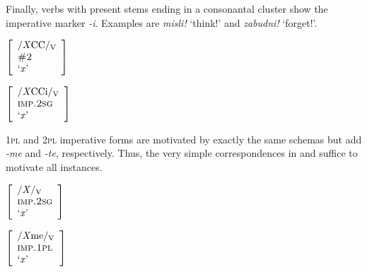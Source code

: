\documentclass[output=paper,colorlinks,citecolor=brown,
]{langscibook}
\begin{document}
\bigskip

\noindent Finally, verbs with present stems ending in a consonantal cluster show the imperative marker \textit{-i}. Examples are \textit{misli!} `think!' and \textit{zabudni!} `forget!'.

\begin{minipage}[t]{0.28\textwidth}
\ea\label{ex:ruleIMP_3}
$\left[
\begin{array}{l}
    \text{/\textit{X}CC/\textsubscript{V}} \\
    \textsc{\#2} \\
    \text{`\textit{x}'}
\end{array}
\right] $ 
\z
\end{minipage}%
\begin{minipage}[t]{0.46\textwidth}
\begin{exe}
\exi{$\longleftrightarrow$}
$\left[
\begin{array}{l}
    \text{/\textit{X}CCi/\textsubscript{V}} \\
    \textsc{imp.2sg} \\
    \text{`\textit{x}'}
\end{array}
\right] $
\end{exe}
\end{minipage}

\bigskip

\noindent \textsc{1pl} and \textsc{2pl} imperative forms are motivated by exactly the same schemas but add \textit{-me} and \textit{-te}, respectively. Thus, the very simple correspondences in  and  suffice to motivate all instances.

\begin{minipage}[t]{0.26\textwidth}
\ea\label{ex:ruleIMP_1PL}
$\left[
\begin{array}{l}
    \text{/\textit{X}/\textsubscript{V}} \\
    \textsc{imp.2sg} \\
    \text{`\textit{x}'}
\end{array}
\right] $ 
\z
\end{minipage}%
\begin{minipage}[t]{0.45\textwidth}
\begin{exe}
\exi{$\longleftrightarrow$}
$\left[
\begin{array}{l}
    \text{/\textit{X}me/\textsubscript{V}} \\
    \textsc{imp.1pl} \\
    \text{`\textit{x}'}
\end{array}
\right] $
\end{exe}
\end{minipage}
\end{document}
